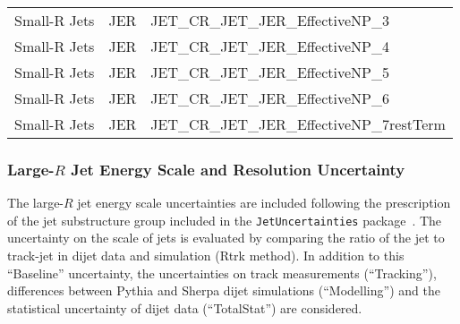 \begin{table}[!hp]
\begin{center}
\begin{tabular}{|l|l|l|}
      Small-R Jets  & JER                  &  JET\_CR\_JET\_JER\_EffectiveNP\_3           \\
      Small-R Jets  & JER                  &  JET\_CR\_JET\_JER\_EffectiveNP\_4           \\
      Small-R Jets  & JER                  &  JET\_CR\_JET\_JER\_EffectiveNP\_5           \\
      Small-R Jets  & JER                  &  JET\_CR\_JET\_JER\_EffectiveNP\_6           \\
      Small-R Jets  & JER                  &  JET\_CR\_JET\_JER\_EffectiveNP\_7restTerm   \\
      \hline
  \end{tabular}
  \end{center}
\end{table}

\subsubsection*{Large-$R$ Jet Energy Scale and Resolution Uncertainty}
\label{sec:fatjetUncert}

The large-$R$ jet energy scale uncertainties are included following the prescription of the
jet substructure group included in the \texttt{JetUncertainties} package~\cite{JSSrecommendation}.
The uncertainty on the \pt scale of jets is evaluated by
comparing the ratio of the jet \pt to track-jet \pt in dijet data and simulation (Rtrk method).
In addition to this ``Baseline'' uncertainty, the uncertainties on track measurements (``Tracking''), differences between Pythia and Sherpa dijet simulations (``Modelling'') and the statistical uncertainty of dijet data (``TotalStat'') are considered.

